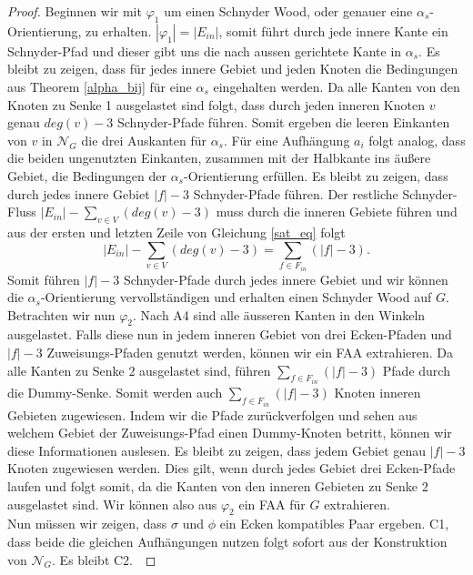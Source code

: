 \begin{proof}
Beginnen wir mit $\varphi_1$ um einen Schnyder Wood, oder genauer eine $\alpha_s$-Orientierung, zu erhalten. $|\varphi_1| = |E_{in}|$, somit führt durch jede innere Kante ein Schnyder-Pfad und dieser gibt uns die nach aussen gerichtete Kante in $\alpha_s$. Es bleibt zu zeigen, dass für jedes innere Gebiet und jeden Knoten die Bedingungen aus Theorem \ref{alpha_bij} für eine $\alpha_s$ eingehalten werden. Da alle Kanten von den Knoten zu Senke 1 ausgelastet sind folgt, dass durch jeden inneren Knoten $v$ genau $deg(v)-3$ Schnyder-Pfade führen. Somit ergeben die leeren Einkanten von $v$ in $\mathcal{N}_G$ die drei Auskanten für $\alpha_s$. Für eine Aufhängung $a_i$ folgt analog, dass die beiden ungenutzten Einkanten, zusammen mit der Halbkante ins äußere Gebiet, die Bedingungen der $\alpha_s$-Orientierung erfüllen. Es bleibt zu zeigen, dass durch jedes innere Gebiet $|f|-3$ Schnyder-Pfade führen. Der restliche Schnyder-Fluss $|E_{in}| - \sum_{v \in V} (deg(v)-3)$ muss durch die inneren Gebiete führen und aus der ersten und letzten Zeile von Gleichung \ref{sat_eq} folgt $$|E_{in}| - \sum_{v \in V} (deg(v)-3) = \sum_{f \in F_{in}} (|f|-3).$$
Somit führen $|f|-3$ Schnyder-Pfade durch jedes innere Gebiet und wir können die $\alpha_s$-Orientierung vervollständigen und erhalten einen Schnyder Wood auf $G$.\\

Betrachten wir nun $\varphi_2$. Nach A4 sind alle äusseren Kanten in den Winkeln ausgelastet. Falls diese nun in jedem inneren Gebiet von drei Ecken-Pfaden und $|f|-3$ Zuweisungs-Pfaden genutzt werden, können wir ein FAA extrahieren. Da alle Kanten zu Senke 2 ausgelastet sind, führen $\sum_{f \in F_{in}} (|f|-3)$ Pfade durch die Dummy-Senke. Somit werden auch $\sum_{f \in F_{in}} (|f|-3)$ Knoten inneren Gebieten zugewiesen. Indem wir die Pfade zurückverfolgen und sehen aus welchem Gebiet der Zuweisungs-Pfad einen Dummy-Knoten betritt, können wir diese Informationen auslesen. Es bleibt zu zeigen, dass jedem Gebiet genau $|f|-3$ Knoten zugewiesen werden. Dies gilt, wenn durch jedes Gebiet drei Ecken-Pfade laufen und folgt somit, da die Kanten von den inneren Gebieten zu Senke 2 ausgelastet sind. Wir können also aus $\varphi_2$ ein FAA für $G$ extrahieren. \\

Nun müssen wir zeigen, dass $\sigma$ und $\phi$ ein Ecken kompatibles Paar ergeben. C1, dass beide die gleichen Aufhängungen nutzen folgt sofort aus der Konstruktion von $\mathcal{N}_G$. Es bleibt C2.\


\end{proof}
